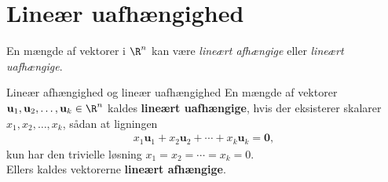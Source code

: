\section{Lineær uafhængighed}
En mængde af vektorer i $\R^n$ kan være \textit{lineært afhængige} eller \textit{lineært uafhængige}.
%
%
% 
\begin{defn}{Lineær afhængighed og lineær uafhængighed}{}
En mængde af vektorer $\mathbf{u}_1, \mathbf{u}_2, \ldots , \mathbf{u}_k \in \R^n$ kaldes \textbf{lineært uafhængige}, hvis der eksisterer skalarer $x_1, x_2, \ldots , x_k$, sådan at ligningen 
\begin{align*}
x_1\mathbf{u}_1 + x_2\mathbf{u}_2 + \cdots + x_k \mathbf{u}_k = \mathbf{0}, 
\end{align*}
kun har den trivielle løsning $x_1 = x_2 = \cdots = x_k = 0$.
\\
Ellers kaldes vektorerne \textbf{lineært afhængige}.
\end{defn}  
%
